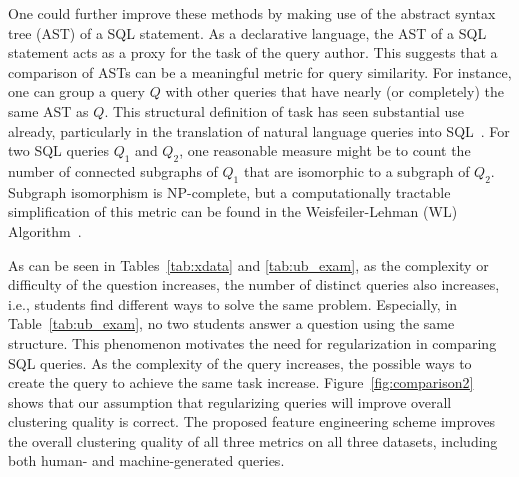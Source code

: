 One could further improve these methods by making use of the abstract syntax tree (AST) of a SQL statement.
As a declarative language, the AST of a SQL statement acts as a proxy for the task of the query author.
This suggests that a comparison of ASTs can be a meaningful metric for query similarity.
For instance, one can group a query $Q$ with other queries that have nearly (or completely) the same AST as $Q$.
This structural definition of task has seen substantial use already, particularly in the translation of natural language queries into SQL~\cite{li2015NLPI}.
For two SQL queries $Q_1$ and $Q_2$, one reasonable measure might be to count the number of connected subgraphs of $Q_1$ that are isomorphic to a subgraph of $Q_2$.  
Subgraph isomorphism is NP-complete, but a computationally tractable simplification of this metric can be found in the Weisfeiler-Lehman (WL) Algorithm~\cite{WL2011, kul2016ettu}.

As can be seen in Tables~\ref{tab:xdata} and \ref{tab:ub_exam}, as the complexity or difficulty of the question increases, the number of distinct queries also increases, i.e., students find different ways to solve the same problem.
Especially, in Table~\ref{tab:ub_exam}, no two students answer a question using the same structure.
This phenomenon motivates the need for regularization in comparing SQL queries.
As the complexity of the query increases, the possible ways to create the query to achieve the same task increase.
Figure~\ref{fig:comparison2} shows that our assumption that regularizing queries will improve overall clustering quality is correct.
The proposed feature engineering scheme improves the overall clustering quality of all three metrics on all three datasets, including both human- and machine-generated queries.
